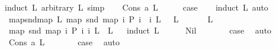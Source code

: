 \begin{isabellebody}
{\isacharparenleft}{\kern0pt}induct\ L{}\ arbitrary{\isacharcolon}{\kern0pt}\ L{\isacharcomma}{\kern0pt}\ simp{\isacharparenright}{\kern0pt}\isanewline
\ \ \isamarkupfalse%
\ {\isacharparenleft}{\kern0pt}Cons\ a\ L{}{\isacharparenright}{\kern0pt}\isanewline
\ \ \isamarkupfalse%
\ \isamarkupfalse%
\ {\isacharquery}{\kern0pt}case\ \isanewline
\ \ \isamarkupfalse%
{\isacharparenleft}{\kern0pt}induct\ L{\isacharcomma}{\kern0pt}\ auto{\isacharparenright}{\kern0pt}\isanewline
\ \ \isamarkupfalse%
\isanewline
{}\isamarkupfalse%
%
\endisatagproof
{\isafoldproof}%
%
\isadelimproof
\isanewline
%
\endisadelimproof
\isanewline
\isanewline
\isanewline
{}\isamarkupfalse%
\ map{\isacharunderscore}{\kern0pt}snd{\isacharunderscore}{\kern0pt}map{\isacharcolon}{\kern0pt}\ {\isachardoublequoteopen}{\isasymAnd}L{\isachardot}{\kern0pt}\ {\isacharparenleft}{\kern0pt}map\ snd\ {\isacharparenleft}{\kern0pt}map\ {\isacharparenleft}{\kern0pt}{\isasymlambda}i{\isachardot}{\kern0pt}\ {\isacharparenleft}{\kern0pt}P\ i\ {\isacharcomma}{\kern0pt}\ i{\isacharparenright}{\kern0pt}{\isacharparenright}{\kern0pt}\ L{\isacharparenright}{\kern0pt}{\isacharparenright}{\kern0pt}\ {\isacharequal}{\kern0pt}\ \ L{\isachardoublequoteclose}\ \isanewline
%
\isadelimproof
%
\endisadelimproof
%
\isatagproof
{}\isamarkupfalse%
\ {\isacharminus}{\kern0pt}\isanewline
\ \ \isamarkupfalse%
\ L\isanewline
\ \ \isamarkupfalse%
\ {\isachardoublequoteopen}map\ snd\ {\isacharparenleft}{\kern0pt}map\ {\isacharparenleft}{\kern0pt}{\isasymlambda}i{\isachardot}{\kern0pt}\ {\isacharparenleft}{\kern0pt}P\ i{\isacharcomma}{\kern0pt}\ i{\isacharparenright}{\kern0pt}{\isacharparenright}{\kern0pt}\ L{\isacharparenright}{\kern0pt}\ {\isacharequal}{\kern0pt}\ L{\isachardoublequoteclose}\isanewline
\ \ \isamarkupfalse%
{\isacharparenleft}{\kern0pt}induct\ L{\isacharparenright}{\kern0pt}\isanewline
\ \ \ \ \isamarkupfalse%
\ Nil\isanewline
\ \ \ \ \isamarkupfalse%
\ \isamarkupfalse%
\ {\isacharquery}{\kern0pt}case\ \isamarkupfalse%
\ auto\isanewline
\ \ \isamarkupfalse%
\isanewline
\ \ \ \ \isamarkupfalse%
\ {\isacharparenleft}{\kern0pt}Cons\ a\ L{\isacharparenright}{\kern0pt}\isanewline
\ \ \ \ \isamarkupfalse%
\ \isamarkupfalse%
\ {\isacharquery}{\kern0pt}case\ \isamarkupfalse%
\ auto\isanewline
\ \ \isamarkupfalse%
\isanewline
{}\isamarkupfalse%
%
\endisatagproof
{\isafoldproof}%
%
\isadelimproof
\isanewline
%
\endisadelimproof
%
\isadelimtheory
%
\endisadelimtheory
%
\isatagtheory
{}\isamarkupfalse%
%
\endisatagtheory
{\isafoldtheory}%
%
\isadelimtheory
%
\endisadelimtheory
%
\end{isabellebody}%
